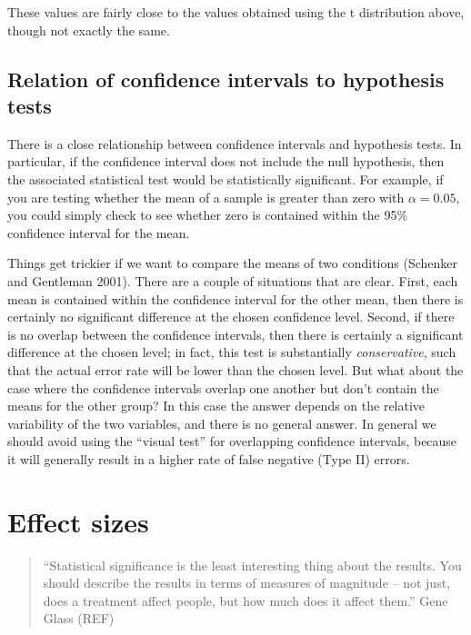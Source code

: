 \documentclass[]{book}
\theoremstyle{definition}
\theoremstyle{definition}
\theoremstyle{definition}
\theoremstyle{remark}
\begin{document}
These values are fairly close to the values obtained using the t
distribution above, though not exactly the same.

\subsection{Relation of confidence intervals to hypothesis
tests}\label{relation-of-confidence-intervals-to-hypothesis-tests}

There is a close relationship between confidence intervals and
hypothesis tests. In particular, if the confidence interval does not
include the null hypothesis, then the associated statistical test would
be statistically significant. For example, if you are testing whether
the mean of a sample is greater than zero with \(\alpha = 0.05\), you
could simply check to see whether zero is contained within the 95\%
confidence interval for the mean.

Things get trickier if we want to compare the means of two conditions
(Schenker and Gentleman 2001). There are a couple of situations that are
clear. First, each mean is contained within the confidence interval for
the other mean, then there is certainly no significant difference at the
chosen confidence level. Second, if there is no overlap between the
confidence intervals, then there is certainly a significant difference
at the chosen level; in fact, this test is substantially
\emph{conservative}, such that the actual error rate will be lower than
the chosen level. But what about the case where the confidence intervals
overlap one another but don't contain the means for the other group? In
this case the answer depends on the relative variability of the two
variables, and there is no general answer. In general we should avoid
using the ``visual test'' for overlapping confidence intervals, because
it will generally result in a higher rate of false negative (Type II)
errors.

\section{Effect sizes}\label{effect-sizes}

\begin{quote}
``Statistical significance is the least interesting thing about the
results. You should describe the results in terms of measures of
magnitude -- not just, does a treatment affect people, but how much does
it affect them.'' Gene Glass (REF)
\end{quote}
\end{document}

